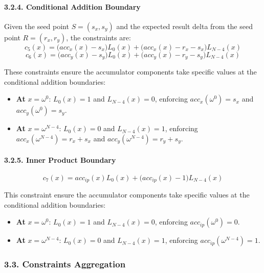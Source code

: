\documentclass[
]{article}
\providecommand{\tightlist}{%
  \setlength{\itemsep}{0pt}\setlength{\parskip}{0pt}}
\begin{document}
\hypertarget{conditional-addition-boundary}{%
\paragraph{3.2.4. Conditional Addition
Boundary}\label{conditional-addition-boundary}}

Given the seed point \(S = (s_x, s_y)\) and the expected result delta
from the seed point \(R = (r_x, r_y)\), the constraints are:
\[c_5(x) = \bigl(acc_x(x) - s_x\bigr)L_0(x) + \bigl(acc_x(x) - r_x - s_x\bigr)L_{N-4}(x)\]
\[c_6(x) = \bigl(acc_y(x) - s_y\bigr)L_0(x) + \bigl(acc_y(x) - r_y - s_y\bigr)L_{N-4}(x)\]

These constraints ensure the accumulator components take specific values
at the conditional addition boundaries:

\begin{itemize}
\tightlist
\item
  \textbf{At} \(x = \omega^0\): \(L_0(x) = 1\) and \(L_{N-4}(x) = 0\),
  enforcing \(acc_x(\omega^0) = s_x\) and \(acc_y(\omega^0) = s_y\).
\item
  \textbf{At} \(x = \omega^{N-4}\): \(L_0(x) = 0\) and
  \(L_{N-4}(x) = 1\), enforcing \(acc_x(\omega^{N-4}) = r_x + s_x\) and
  \(acc_y(\omega^{N-4}) = r_y + s_y\).
\end{itemize}

\hypertarget{inner-product-boundary}{%
\paragraph{3.2.5. Inner Product Boundary}\label{inner-product-boundary}}

\[c_7(x) = acc_{ip}(x)L_0(x) + \bigl(acc_{ip}(x) - 1\bigr)L_{N-4}(x)\]

This constraint ensure the accumulator components take specific values
at the conditional addition boundaries:

\begin{itemize}
\tightlist
\item
  \textbf{At} \(x = \omega^0\): \(L_0(x) = 1\) and \(L_{N-4}(x) = 0\),
  enforcing \(acc_{ip}(\omega^0) = 0\).
\item
  \textbf{At} \(x = \omega^{N-4}\): \(L_0(x) = 0\) and
  \(L_{N-4}(x) = 1\), enforcing \(acc_{ip}(\omega^{N-4}) =1\).
\end{itemize}

\hypertarget{constraints-aggregation}{%
\subsubsection{3.3. Constraints
Aggregation}\label{constraints-aggregation}}
\end{document}
